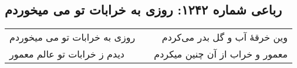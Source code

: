 \begin{center}
\section*{رباعی شماره ۱۲۴۲: روزی به خرابات تو می میخوردم}
\label{sec:1242}
\begin{longtable}{l p{0.5cm} r}
روزی به خرابات تو می میخوردم
&&
وین خرقهٔ آب و گل بدر می‌کردم
\\
دیدم ز خرابات تو عالم معمور
&&
معمور و خراب از آن چنین میکردم
\\
\end{longtable}
\end{center}
